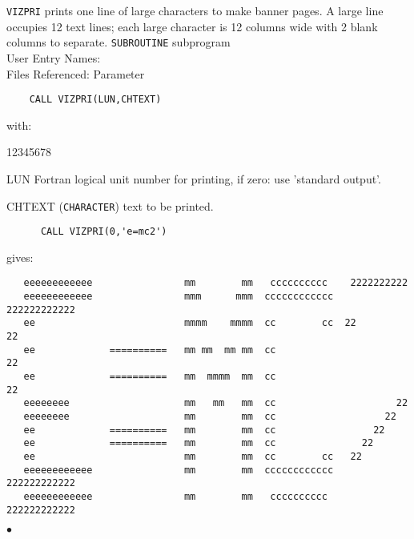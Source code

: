                          
                         
\Submitter{}                             
{\tt VIZPRI} prints one line of large characters to make banner pages.
A large line occupies 12 text lines;
each large character is 12 columns wide with 2 blank columns to separate.
\Structure
{\tt SUBROUTINE} subprogram \\
User Entry Names:  \\
Files Referenced: Parameter\\
\Usage
\begin{verbatim}
    CALL VIZPRI(LUN,CHTEXT)
\end{verbatim}
with:
\begin{DLtt}{12345678}
\item [LUN] Fortran logical unit number for printing,
            if zero: use 'standard output'.
\item [CHTEXT] ({\tt CHARACTER}) text to be printed.
\end{DLtt}
\Examples
\begin{verbatim}
      CALL VIZPRI(0,'e=mc2')
\end{verbatim}
gives:
{\footnotesize
\begin{verbatim}
   eeeeeeeeeeee                mm        mm   cccccccccc    2222222222
   eeeeeeeeeeee                mmm      mmm  cccccccccccc  222222222222
   ee                          mmmm    mmmm  cc        cc  22        22
   ee             ==========   mm mm  mm mm  cc                      22
   ee             ==========   mm  mmmm  mm  cc                      22
   eeeeeeee                    mm   mm   mm  cc                     22
   eeeeeeee                    mm        mm  cc                   22
   ee             ==========   mm        mm  cc                 22
   ee             ==========   mm        mm  cc               22
   ee                          mm        mm  cc        cc   22
   eeeeeeeeeeee                mm        mm  cccccccccccc  222222222222
   eeeeeeeeeeee                mm        mm   cccccccccc   222222222222
\end{verbatim}
}
$\bullet$

